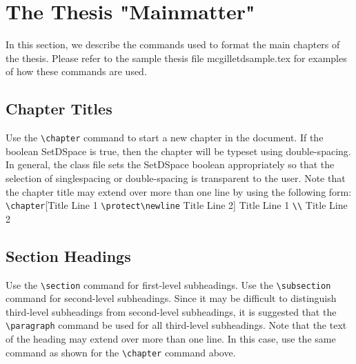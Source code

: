 \documentclass[12pt,Bold,letterpaper,TexShade]{mcgilletdclass}
\numberwithin{equation}{section}
\begin{document}
\chapter{The Thesis "Mainmatter"}
In this section, we describe the commands used to format the
main chapters of the thesis. Please refer to the sample thesis file
mcgilletdsample.tex for examples of how these commands are used.
\section{Chapter Titles}
Use the \verb=\chapter= command to start a new chapter in the document. If 
the boolean SetDSpace is true, then the chapter will
be typeset using double-spacing. In general, the class file sets the
SetDSpace boolean appropriately so that the selection of singlespacing
or double-spacing is transparent to the user.
Note that the chapter title may extend over more than one line
by using the following form:
\verb=\chapter=[Title Line 1 \verb=\protect\newline= Title Line 2]{%
Title Line 1 \verb=\\= Title Line 2}%
\section{Section Headings}
Use the \verb=\section= command for first-level subheadings. Use the 
\verb=\subsection= command for second-level subheadings. Since it
may be difficult to distinguish third-level subheadings from second-level
subheadings, it is suggested that the \verb=\paragraph= command be
used for all third-level subheadings. Note that the text of the heading
may extend over more than one line. In this case, use the same command
as shown for the \verb=\chapter= command above.
\end{document}
